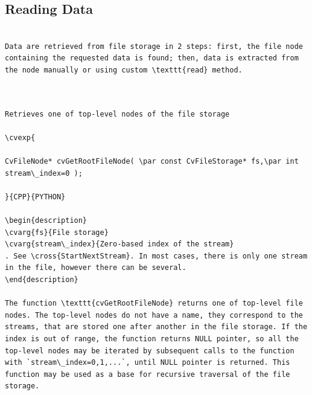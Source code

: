 \subsection{Reading Data}
\begin{verbatim}

Data are retrieved from file storage in 2 steps: first, the file node containing the requested data is found; then, data is extracted from the node manually or using custom \texttt{read} method.


\end{verbatim}
\label{GetRootFileNode}
\begin{verbatim}

Retrieves one of top-level nodes of the file storage

\cvexp{

CvFileNode* cvGetRootFileNode( \par const CvFileStorage* fs,\par int stream\_index=0 );

}{CPP}{PYTHON}

\begin{description}
\cvarg{fs}{File storage}
\cvarg{stream\_index}{Zero-based index of the stream}
. See \cross{StartNextStream}. In most cases, there is only one stream in the file, however there can be several.
\end{description}

The function \texttt{cvGetRootFileNode} returns one of top-level file nodes. The top-level nodes do not have a name, they correspond to the streams, that are stored one after another in the file storage. If the index is out of range, the function returns NULL pointer, so all the top-level nodes may be iterated by subsequent calls to the function with `stream\_index=0,1,...`, until NULL pointer is returned. This function may be used as a base for recursive traversal of the file storage.


\end{verbatim}
\label{GetFileNodeByName}
